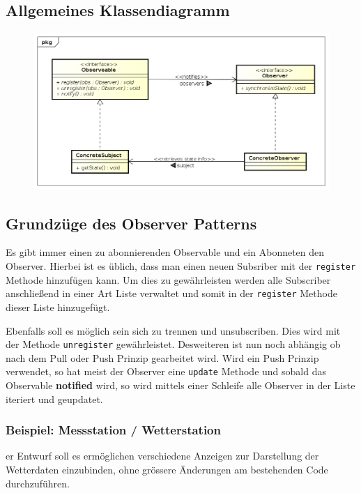 	\subsection{Allgemeines Klassendiagramm}
	\begin{figure}[!h]
		\begin{center}
			\includegraphics[width=0.9\linewidth]{images/obs.png}
		\end{center}
	\end{figure}
	
	\subsection{Grundzüge des Observer Patterns}
	Es gibt immer einen zu abonnierenden Observable und ein Abonneten den Observer. Hierbei ist es üblich, dass man einen neuen Subsriber mit der \texttt{register} Methode hinzufügen kann. Um dies zu gewährleisten werden alle Subscriber anschließend in einer Art Liste verwaltet und somit in der \texttt{register} Methode dieser Liste hinzugefügt.
	
	Ebenfalls soll es möglich sein sich zu trennen und unsubscriben. Dies wird mit der Methode \texttt{unregister} gewährleistet. Desweiteren ist nun noch abhängig ob nach dem Pull oder Push Prinzip gearbeitet wird. Wird ein Push Prinzip verwendet, so hat meist der Observer eine \texttt{update} Methode und sobald das Observable \textbf{notified} wird, so wird mittels einer Schleife alle Observer in der Liste iteriert und geupdatet.
		

\clearpage


	\subsubsection{Beispiel: Messstation / Wetterstation \cite{new}}
	er Entwurf soll es ermöglichen verschiedene Anzeigen zur Darstellung der Wetterdaten einzubinden, ohne grössere Änderungen am bestehenden Code durchzuführen.
	
